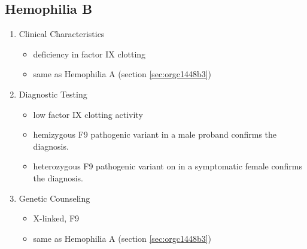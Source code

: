 \documentclass{scrartcl}
\begin{document}
\subsection{Hemophilia B}
\label{sec:orgc0ffe5d}
\begin{enumerate}
\item Clinical Characteristics
\label{sec:org9c04bed}
\begin{itemize}
\item deficiency in factor IX clotting
\item same as Hemophilia A (section \ref{sec:orgc1448b3})
\end{itemize}
\item Diagnostic Testing
\label{sec:org8f73153}
\begin{itemize}
\item low factor IX clotting activity
\item hemizygous F9 pathogenic variant in a male proband confirms the
diagnosis.
\item heterozygous F9 pathogenic variant on in a symptomatic female
confirms the diagnosis.
\end{itemize}
\item Genetic Counseling
\label{sec:org653ea78}
\begin{itemize}
\item X-linked, F9
\item same as Hemophilia A (section \ref{sec:orgc1448b3})
\end{itemize}
\end{enumerate}
\end{document}
